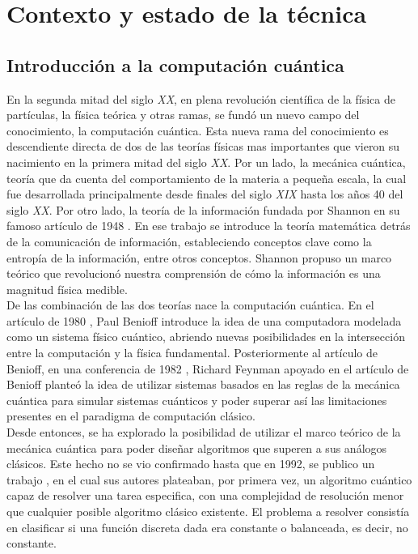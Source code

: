 \chapter{Contexto y estado de la técnica}

\section{Introducción a la computación cuántica}

En la segunda mitad del siglo \textit{XX}, en plena revolución científica de la física de partículas, la física teórica y otras ramas, se fundó un nuevo campo del conocimiento, la computación cuántica. Esta nueva rama del conocimiento es descendiente directa de dos de las teorías físicas mas importantes que vieron su nacimiento en la primera mitad del siglo \textit{XX}. Por un lado, la mecánica cuántica, teoría que da cuenta del comportamiento de la materia a pequeña escala, la cual fue desarrollada principalmente desde finales del siglo \textit{XIX} hasta los años 40 del siglo \textit{XX}. Por otro lado, la teoría de la información fundada por Shannon en su famoso artículo de 1948 \citep{Shannon1948}. En ese trabajo se introduce la teoría matemática detrás de la comunicación de información, estableciendo conceptos clave como la entropía de la información, entre otros conceptos. Shannon propuso un marco teórico que revolucionó nuestra comprensión de cómo la información es una magnitud física medible. \\

De las combinación de las dos teorías nace la computación cuántica. En el artículo de 1980 \citep{benioff}, Paul Benioff introduce la idea de una computadora modelada como un sistema físico cuántico, abriendo nuevas posibilidades en la intersección entre la computación y la física fundamental. Posteriormente al artículo de Benioff, en una conferencia de 1982 \citep{richard}, Richard Feynman apoyado en el artículo de Benioff planteó la idea de utilizar sistemas basados en las reglas de la mecánica cuántica para simular sistemas cuánticos y poder superar así las limitaciones presentes en el paradigma de computación clásico. \\

Desde entonces, se ha explorado la posibilidad de utilizar el marco teórico de la mecánica cuántica para poder diseñar algoritmos que superen a sus análogos clásicos. Este hecho no se vio confirmado hasta que en 1992, se publico un trabajo \citep{deutsch}, en el cual sus autores plateaban, por primera vez, un algoritmo cuántico capaz de resolver una tarea especifica, con una complejidad de resolución menor que cualquier posible algoritmo clásico existente. El problema a resolver consistía en clasificar si una función discreta dada era constante o balanceada, es decir, no constante. \\

